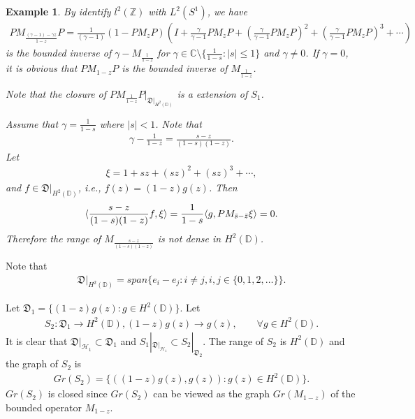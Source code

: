 \documentclass[a4paper,10pt]{amsart}
\newtheorem{example}{Example}[section]
\newcommand{\HHH}{\mathcal H} %
\newcommand{\DDD}{\mathfrak D}
\newcommand{\C}{\mathbb C} %
\newcommand{\Z}{\mathbb Z} %
\newcommand{\Hd}{H^{2}(\mathbb{D})}
\begin{document}
\begin{example}
    By identify $l^2(\Z)$ with $L^{2}(S^1)$, we have
    \begin{align*}
        PM_{\frac{(\gamma -1)-\gamma z}{1-z}}P = 
        \frac{1}{(\gamma -1)}(1-PM_{z}P)(I + \frac{\gamma}{\gamma-1}PM_{z}P
        + (\frac{\gamma}{\gamma-1}PM_{z}P)^{2} 
        + (\frac{\gamma}{\gamma-1}PM_{z}P)^{3}
        + \cdots)     
    \end{align*}
    is the bounded inverse of $\gamma - M_{\frac{1}{1-z}}$ 
    for $\gamma \in \C \setminus \{\frac{1}{1-s} : |s| \leq 1 \}$ 
    and $\gamma \neq 0$.
    If $\gamma = 0$, it is obvious that $PM_{1-z}P$ is the bounded 
    inverse of $M_{\frac{1}{1-z}}$.
    
    Note that the closure of $PM_{\frac{1}{1-z}}P|_{\DDD|_{\Hd}}$
    is a extension of $S_1$.

    Assume that $\gamma = \frac{1}{1-s}$ where $|s| < 1$. Note that
    \begin{align*}
        \gamma - \frac{1}{1-z} = \frac{s-z}{(1-s)(1-z)}. 
    \end{align*}
    Let
    \begin{align*}
        \xi = 1 + sz + (sz)^2 + (sz)^3 + \cdots, 
    \end{align*} 
    and $f \in \DDD|_{\Hd}$, i.e., $f(z) = (1-z)g(z)$. Then
    \begin{align*}
       \langle  \frac{s-z}{(1-s)(1-z)} f, \xi \rangle = 
       \frac{1}{1-s}\langle g, PM_{\Bar{s} - \Bar{z}} \xi \rangle = 0.   
    \end{align*}
    Therefore the range of $M_{\frac{s-z}{(1-s)(1-z)}}$ 
    is not dense in $\Hd$.
\end{example}

Note that
\begin{align*}
    \DDD|_{\Hd} = span \{e_i - e_j : i \neq j, i,j 
    \in \{0, 1, 2, \ldots\} \}.
\end{align*}


Let $\DDD_1 = \{(1-z)g(z) : g \in \Hd \}$.
Let 
\begin{align*}
    S_2: \DDD_1 \to \Hd, (1-z)g(z) \to g(z), \qquad \forall g \in \Hd. 
\end{align*}
It is clear that $\DDD|_{\HHH_1} \subset \DDD_1$ and $S_1 |_{\DDD|_{\HHH_1}}
\subset S_2|_{\DDD_2}$.
The range of $S_2$ is $\Hd$ and the graph of $S_2$ is
\begin{align*}
    Gr(S_2)=\{((1-z)g(z), g(z)) : g(z) \in \Hd\}. 
\end{align*}
$Gr(S_2)$ is closed since $Gr(S_2)$ can be viewed as the graph 
$Gr(M_{1-z})$ of the bounded operator $M_{1-z}$. 
\end{document}
